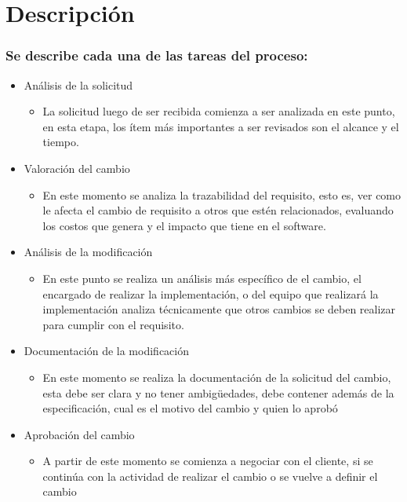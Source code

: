 \newpage
\section{Descripción}

\subsubsection{Se describe cada una de las tareas del proceso:}

\begin{itemize}
    \item Análisis de la solicitud
    \begin{itemize}
        \item La solicitud luego de ser recibida comienza a ser analizada en este punto, en esta etapa, los ítem más importantes a ser revisados son el alcance y el tiempo.
    \end{itemize}
    \item Valoración del cambio
    \begin{itemize}
        \item En este momento se analiza la trazabilidad del requisito, esto es, ver como le afecta el cambio de requisito a otros que estén relacionados, evaluando los costos que genera y el impacto que tiene en el software.
    \end{itemize}
    \item Análisis de la modificación
    \begin{itemize}
        \item En este punto se realiza un análisis más específico de el cambio, el encargado de realizar la implementación, o del equipo que realizará la implementación analiza técnicamente que otros cambios se deben realizar para cumplir con el requisito.
    \end{itemize}
    \item Documentación de la modificación
    \begin{itemize}
        \item En este momento se realiza la documentación de la solicitud del cambio, esta debe ser clara y no tener ambigüedades, debe contener además de la especificación, cual es el motivo del cambio y quien lo aprobó
    \end{itemize}
    \item Aprobación del cambio
    \begin{itemize}
        \item A partir de este momento se comienza a negociar con el cliente, si se continúa con la actividad de realizar el cambio o se vuelve a definir el cambio

\end{itemize}
\end{itemize}
